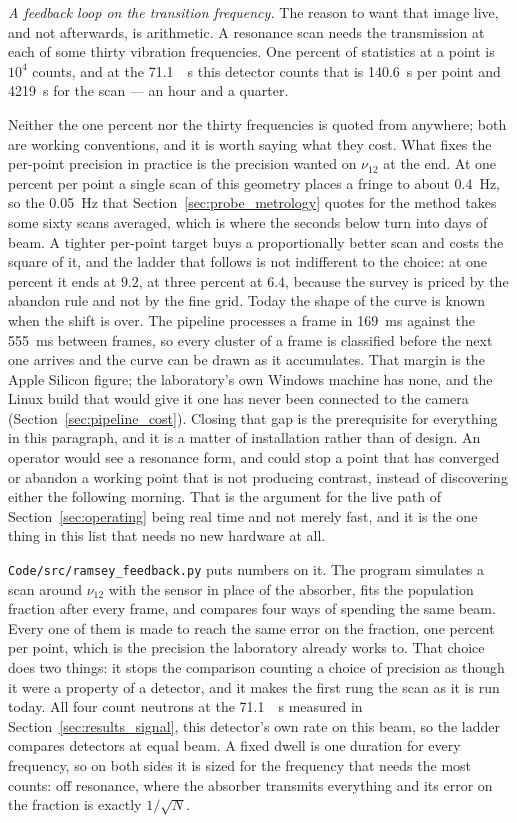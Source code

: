 \documentclass[a4paper,headsepline,oneside,11pt]{scrartcl}
\begin{document}
\emph{A feedback loop on the transition frequency.}\label{par:scan_arithmetic}
The reason to want that image live, and not afterwards, is arithmetic. A
resonance scan needs the transmission at each of some thirty vibration
frequencies. One percent of statistics at a point is $10^4$ counts, and at the
\SI{71.1}{\per\second} this detector counts that is \SI{140.6}{\second} per
point and \SI{4219}{\second} for the scan --- an hour and a quarter.

Neither the one percent nor the thirty frequencies is quoted from anywhere; both
are working conventions, and it is worth saying what they cost. What fixes the
per-point precision in practice is the precision wanted on $\nu_{12}$ at the end.
At one percent per point a single scan of this geometry places a fringe to about
\SI{0.4}{\hertz}, so the \SI{0.05}{\hertz} that Section~\ref{sec:probe_metrology}
quotes for the method takes some sixty scans averaged, which is where the
seconds below turn into days of beam. A tighter per-point target buys a
proportionally better scan and costs the square of it, and the ladder that
follows is not indifferent to the choice: at one percent it ends at $9.2$, at
three percent at $6.4$, because the survey is priced by the abandon rule and not
by the fine grid. Today the
shape of the curve is known when the shift is over. The pipeline processes a
frame in \SI{169}{\milli\second} against the \SI{555}{\milli\second} between
frames, so every cluster of a frame is classified before the next one arrives
and the curve can be drawn as it accumulates. That margin is the Apple Silicon
figure; the laboratory's own Windows machine has none, and the Linux build that
would give it one has never been connected to the camera
(Section~\ref{sec:pipeline_cost}). Closing that gap is the prerequisite for
everything in this paragraph, and it is a matter of installation rather than of
design. An operator would see a resonance
form, and could stop a point that has converged or abandon a working point that
is not producing contrast, instead of discovering either the following morning.
That is the argument for the live path of Section~\ref{sec:operating} being real
time and not merely fast, and it is the one thing in this list that needs no new
hardware at all.

\texttt{Code/src/ramsey\_feedback.py} puts numbers on it. The program simulates
a scan around $\nu_{12}$ with the sensor in place of the absorber, fits the
population fraction after every frame, and compares four ways of spending the
same beam. Every one of them is made to reach the same error on the fraction,
one percent per point, which is the precision the laboratory already works to.
That choice does two things: it stops the comparison counting a choice of
precision as though it were a property of a detector, and it makes the first
rung the scan as it is run today. All four count neutrons at the
\SI{71.1}{\per\second} measured in Section~\ref{sec:results_signal}, this
detector's own rate on this beam, so the ladder compares detectors at equal
beam. A fixed dwell is one duration for every frequency, so on both sides it is
sized for the frequency that needs the most counts: off resonance, where the
absorber transmits everything and its error on the fraction is exactly
$1/\sqrt{N}$.
\end{document}
